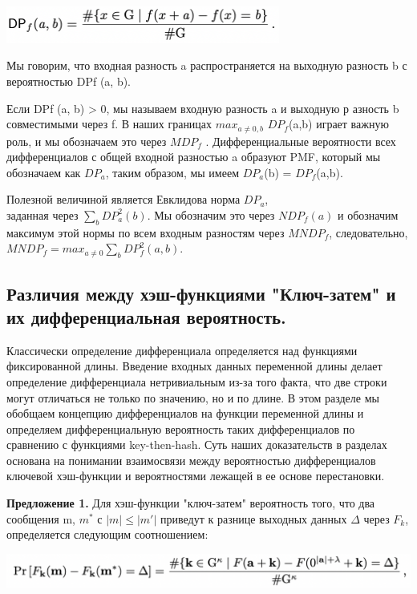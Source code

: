 \documentclass[utf8,14pt,a4paper,oneside,russian]{book}
\begin{document}
\includegraphics[width=9cm]{form4}

Мы говорим, что входная разность a распространяется на выходную 
разность b с вероятностью DPf (a, b). 

Если DPf (a, b) > 0, мы называем входную разность a и выходную р
азность b совместимыми через f. В наших границах $max_{a\neq0,b}$ $DP_f$(a,b) 
играет важную роль, и мы обозначаем это через $MDP_f$ . Дифференциальные 
вероятности всех дифференциалов с общей входной разностью a образуют PMF, 
который мы обозначаем как $DP_a$, таким образом, мы имеем $DP_a$(b) = $DP_f$(a,b).

\newpage
Полезной величиной является Евклидова норма $DP_a$, \\
заданная через $\sum_b DP^2_a(b)$. Мы обозначим это через $NDP_f(a)$ и обозначим максимум этой нормы по всем 
входным разностям через $MNDP_f$, следовательно, $MNDP_f= max_{a\neq0} \sum_b DP^2_f (a, b)$.

\subsection{Различия между хэш-функциями "Ключ-затем" и их дифференциальная вероятность.}

Классически определение дифференциала определяется над функциями фиксированной 
длины. Введение входных данных переменной длины делает определение 
дифференциала нетривиальным из-за того факта, что две строки могут 
отличаться не только по значению, но и по длине. В этом разделе мы 
обобщаем концепцию дифференциалов на функции переменной длины и 
определяем дифференциальную вероятность таких дифференциалов по сравнению 
с функциями key-then-hash. Суть наших доказательств в разделах 
основана на понимании взаимосвязи между вероятностью дифференциалов ключевой 
хэш-функции и вероятностями лежащей в ее основе перестановки.

\textbf{Предложение 1.} Для хэш-функции "ключ-затем" вероятность того, что два 
сообщения m, $m^*$ с $|m| \le |m'|$ приведут к разнице выходных данных 
$\Delta$ через $F_k$, определяется следующим соотношением:

\includegraphics[width=15cm]{form5}
\end{document}
